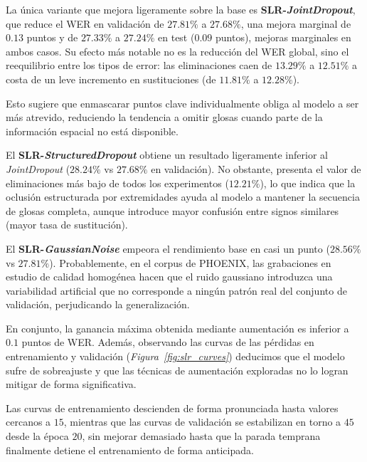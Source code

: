 La única variante que mejora ligeramente sobre la base es \textbf{SLR-\textit{JointDropout}}, que reduce el WER en validación de $27.81\%$ a $27.68\%$, una mejora marginal de $0.13$ puntos y de $27.33\%$ a $27.24\%$ en test ($0.09$ puntos), mejoras marginales en ambos casos.
Su efecto más notable no es la reducción del WER global, sino el reequilibrio entre los tipos de error: las eliminaciones caen de $13.29\%$ a $12.51\%$ a costa de un leve incremento en sustituciones (de $11.81\%$ a $12.28\%$).

Esto sugiere que enmascarar puntos clave individualmente obliga al modelo a ser más atrevido, reduciendo la tendencia a omitir glosas cuando parte de la información espacial no está disponible.

El \textbf{SLR-\textit{StructuredDropout}} obtiene un resultado ligeramente inferior al \textit{JointDropout} ($28.24\%$ vs $27.68\%$ en validación).
No obstante, presenta el valor de eliminaciones más bajo de todos los experimentos ($12.21\%$), lo que indica que la oclusión estructurada por extremidades ayuda al modelo a mantener la secuencia de glosas completa, aunque introduce mayor confusión entre signos similares (mayor tasa de sustitución).

El \textbf{SLR-\textit{GaussianNoise}} empeora el rendimiento base en casi un punto ($28.56\%$ vs $27.81\%$).
Probablemente, en el corpus de PHOENIX, las grabaciones en estudio de calidad homogénea hacen que el ruido gaussiano introduzca una variabilidad artificial que no corresponde a ningún patrón real del conjunto de validación, perjudicando la generalización.

%

En conjunto, la ganancia máxima obtenida mediante aumentación es inferior a $0.1$ puntos de WER. Además, observando las curvas de las pérdidas en entrenamiento y validación (\textit{Figura~\ref{fig:slr_curves}}) deducimos que el modelo sufre de sobreajuste y que las técnicas de aumentación exploradas no lo logran mitigar de forma significativa.

Las curvas de entrenamiento descienden de forma pronunciada hasta valores cercanos a $15$, mientras que las curvas de validación se estabilizan en torno a $45$ desde la época $20$, sin mejorar demasiado hasta que la parada temprana finalmente detiene el entrenamiento de forma anticipada.


